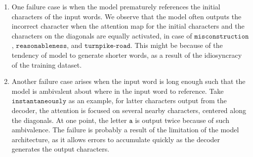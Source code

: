 \documentclass[11pt]{article}
\begin{document}
\begin{enumerate}
\begin{enumerate}
    \begin{enumerate}
        \item One failure case is when the model prematurely references the initial characters of the input words. We observe that the model often outputs the incorrect character when the attention map for the initial characters and the characters on the diagonals are equally activated, in case of $\texttt{misconstruction}$, $\texttt{reasonableness}$, and $\texttt{turnpike-road}$. This might be because of the tendency of model to generate shorter words, as a result of the idiosyncracy of the training dataset.
        \item Another failure case arises when the input word is long enough such that the model is ambivalent about where in the input word to reference. Take $\texttt{instantaneously}$ as an example, for latter characters output from the decoder, the attention is focused on several nearby characters, centered along the diagonals. At one point, the letter $\texttt{a}$ is output twice because of such ambivalence. The failure is probably a result of the limitation of the model architecture, as it allows errors to accumulate quickly as the decoder generates the output characters. 
    \end{enumerate}

\end{enumerate}


    
\end{enumerate}
\end{document}
